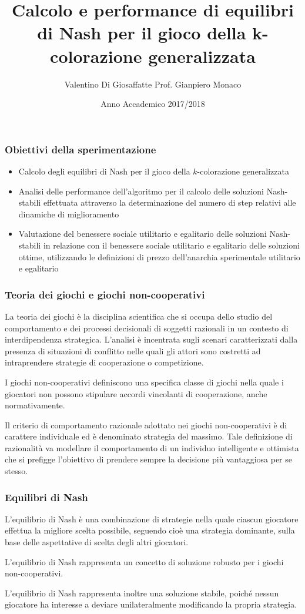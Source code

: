 \documentclass{beamer}
\title{Calcolo e performance di equilibri di Nash per il gioco della k-colorazione generalizzata}
\author{Valentino Di Giosaffatte \hfill Prof. Gianpiero Monaco}
\institute{Università degli Studi dell'Aquila}
\date{Anno Accademico 2017/2018}
\begin{document}
\frame{\titlepage}


\begin{frame}
\frametitle{Obiettivi della sperimentazione}
\begin{itemize}
	\item Calcolo degli equilibri di Nash per il gioco della $k$-colorazione generalizzata
	\item Analisi delle performance dell'algoritmo per il calcolo delle soluzioni Nash-stabili effettuata attraverso la determinazione del numero di step relativi alle dinamiche di miglioramento
	\item Valutazione del benessere sociale utilitario e egalitario delle soluzioni Nash-stabili in relazione con il benessere sociale utilitario e egalitario delle soluzioni ottime, utilizzando le definizioni di prezzo dell'anarchia sperimentale utilitario e egalitario
\end{itemize}
\end{frame}


\begin{frame}
\frametitle{Teoria dei giochi e giochi non-cooperativi}
La \alert{teoria dei giochi} è la disciplina scientifica che si occupa dello studio del comportamento e dei processi decisionali di soggetti razionali in un contesto di interdipendenza strategica. L'analisi è incentrata sugli scenari caratterizzati dalla presenza di situazioni di conflitto nelle quali gli attori sono costretti ad intraprendere strategie di cooperazione o competizione.\medskip

I \alert{giochi non-cooperativi} definiscono una specifica classe di giochi nella quale i giocatori non possono stipulare accordi vincolanti di cooperazione, anche normativamente.\medskip

Il criterio di comportamento razionale adottato nei giochi non-cooperativi è di carattere individuale ed è denominato \alert{strategia del massimo}. Tale definizione di razionalità va modellare il comportamento di un individuo intelligente e ottimista che si prefigge l'obiettivo di prendere sempre la decisione più vantaggiosa per se stesso.
\end{frame}


\begin{frame}
\frametitle{Equilibri di Nash}
L'equilibrio di Nash è una combinazione di strategie nella quale ciascun giocatore effettua la migliore scelta possibile, seguendo cioè una \alert{strategia dominante}, sulla base delle aspettative di scelta degli altri giocatori.\medskip

L'equilibrio di Nash rappresenta un \alert{concetto di soluzione} robusto per i giochi non-cooperativi.\medskip

L'equilibrio di Nash rappresenta inoltre una \alert{soluzione stabile}, poiché nessun giocatore ha interesse a deviare unilateralmente modificando la propria strategia.
\end{frame}
\end{document}
